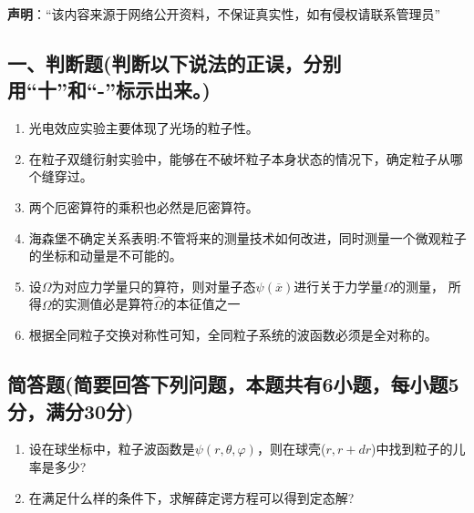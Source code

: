 
\textbf{声明}：“该内容来源于网络公开资料，不保证真实性，如有侵权请联系管理员”

\subsection{一、判断题(判断以下说法的正误，分别用“十”和“-”标示出来。)}
\begin{enumerate}
\item 光电效应实验主要体现了光场的粒子性。
\item 在粒子双缝衍射实验中，能够在不破坏粒子本身状态的情况下，确定粒子从哪个缝穿过。
\item 两个厄密算符的乘积也必然是厄密算符。
\item 海森堡不确定关系表明:不管将来的测量技术如何改进，同时测量一个微观粒子的坐标和动量是不可能的。
\item 设$\Omega$为对应力学量只的算符，则对量子态$\psi(\overline x)$进行关于力学量$\Omega$的测量，
所得$\Omega$的实测值必是算符$\hat\Omega$的本征值之一
\item 根据全同粒子交换对称性可知，全同粒子系统的波函数必须是全对称的。
\end{enumerate}
\subsection{简答题(简要回答下列问题，本题共有6小题，每小题5分，满分30分)}
\begin{enumerate}
\item 设在球坐标中，粒子波函数是$\psi(r,\theta,\varphi)$，则在球壳($r,r+dr$)中找到粒子的儿
率是多少?
\item 在满足什么样的条件下，求解薛定谔方程可以得到定态解?
\end{enumerate}
